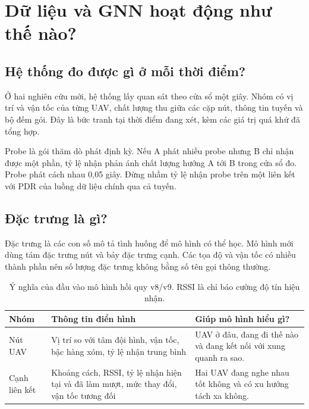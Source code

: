 \chapter{Dữ liệu và GNN hoạt động như thế nào?}
\section{Hệ thống đo được gì ở mỗi thời điểm?}
Ở hai nghiên cứu mới, hệ thống lấy quan sát theo cửa sổ một giây. Nhóm có vị trí và vận tốc của từng UAV, chất lượng thu giữa các cặp nút, thông tin tuyến và bộ đếm gói. Đây là bức tranh tại thời điểm đang xét, kèm các giá trị quá khứ đã tổng hợp.

Probe là gói thăm dò phát định kỳ. Nếu A phát nhiều probe nhưng B chỉ nhận được một phần, tỷ lệ nhận phản ánh chất lượng hướng A tới B trong cửa sổ đo. Probe phát cách nhau 0,05 giây. Đừng nhầm tỷ lệ nhận probe trên một liên kết với PDR của luồng dữ liệu chính qua cả tuyến.


\section{Đặc trưng là gì?}
Đặc trưng là các con số mô tả tình huống để mô hình có thể học. Mô hình mới dùng tám đặc trưng nút và bảy đặc trưng cạnh. Các tọa độ và vận tốc có nhiều thành phần nên số lượng đặc trưng không bằng số tên gọi thông thường.

\begin{table}[htbp]
\centering
\begin{tabularx}{\linewidth}{@{}p{30mm}YY@{}}
\toprule Nhóm & Thông tin điển hình & Giúp mô hình hiểu gì?\\\midrule
Nút UAV & Vị trí so với tâm đội hình, vận tốc, bậc hàng xóm, tỷ lệ nhận trung bình & UAV ở đâu, đang đi thế nào và đang kết nối với xung quanh ra sao.\\
Cạnh liên kết & Khoảng cách, RSSI, tỷ lệ nhận hiện tại và đã làm mượt, mức thay đổi, vận tốc tương đối & Hai UAV đang nghe nhau tốt không và có xu hướng tách xa không.\\\bottomrule
\end{tabularx}
\caption{Ý nghĩa của đầu vào mô hình hồi quy v8/v9. RSSI là chỉ báo cường độ tín hiệu nhận.}\label{tab:features}
\end{table}

